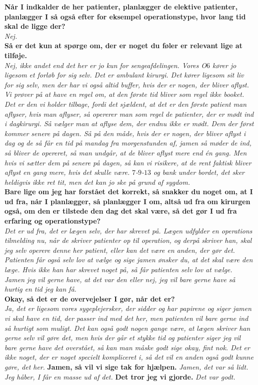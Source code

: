 \textbf{Når I indkalder de her patienter, planlægger de elektive patienter, planlægger I så også efter for eksempel operationstype, hvor lang tid skal de ligge der?}\\
\noindent
\textit{Nej.} \\
\noindent
\textbf{Så er det kun at spørge om, der er noget du føler er relevant lige at tilføje.} \\
\noindent
\textit{Nej, ikke andet end det her er jo kun for sengeafdelingen. Vores O$6$ kører jo ligesom et forløb for sig selv. Det er ambulant kirurgi. Det kører ligesom sit liv for sig selv, men der har vi også altid buffer, hvis der er nogen, der bliver aflyst. Vi prøver på at have en regel om, at den første tid bliver som regel ikke booket. Det er den vi holder tilbage, fordi det sjældent, at det er den første patient man aflyser, hvis man aflyser, så opererer man som regel de patienter, der er mødt ind i dagkirurgi. Så vælger man at aflyse dem, der endnu ikke er mødt. Dem der først kommer senere på dagen. Så på den måde, hvis der er nogen, der bliver aflyst i dag og de så får en tid på mandag fra morgenstunden af, jamen så møder de ind, så bliver de opereret, så man undgår, at de bliver aflyst mere end én gang. Men hvis vi sætter dem på senere på dagen, så kan vi risikere, at de rent faktisk bliver aflyst en gang mere, hvis det skulle være. $7$-$9$-$13$ og bank under bordet, det sker heldigvis ikke ret tit, men det kan jo ske på grund af sygdom.} \\
\noindent
\textbf{Bare lige om jeg har forstået det korrekt, så snakker du noget om, at I ud fra, når I planlægger, så planlægger I om, altså ud fra om kirurgen også, om den er tilstede den dag det skal være, så det gør I ud fra erfaring og operationstype?}\\
\noindent
\textit{Det er ud fra, det er lægen selv, der har skrevet på. Lægen udfylder en operations tilmelding nu, når de skriver patienter op til operation, og derpå skriver han, skal jeg selv operere denne her patient, eller kan det være en anden, der gør det. Patienten får også selv lov at vælge og sige jamen ønsker du, at det skal være den læge. Hvis ikke han har skrevet noget på, så får patienten selv lov at vælge. Jamen jeg vil gerne have, at det var den eller nej, jeg vil bare gerne have så hurtig en tid jeg kan få.} \\
\noindent
\textbf{Okay, så det er de overvejelser I gør, når det er?}\\
\noindent
\textit{Ja, det er ligesom vores sygeplejersker, der sidder og har papirene og siger jamen vi skal have en tid, der passer ind med det her, men patienten vil bare gerne ind så hurtigt som muligt. Det kan også godt nogen gange være, at lægen skriver han gerne selv vil gøre det, men hvis der går et stykke tid og patienter siger jeg vil bare gerne have det overstået, så kan man måske godt sige okay, fint nok. Det er ikke noget, der er noget specielt kompliceret i, så det vil en anden også godt kunne gøre, det her.}
\noindent
\textbf{Jamen, så vil vi sige tak for hjælpen.}
\noindent
\textit{Jamen, det var så lidt. Jeg håber, I får en masse ud af det.}
\noindent
\textbf{Det tror jeg vi gjorde.}
\noindent
\textit{Det var godt.}